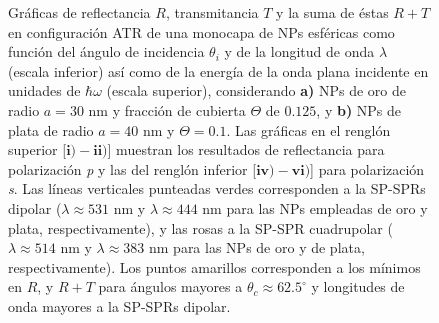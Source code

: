 \begin{figure}[b!]
\begin{subfigure}{.7\linewidth}
		\end{subfigure}\vspace*{-.5em}
	\caption{Gráficas de reflectancia $R$, transmitancia $T$ y la suma de éstas $R+T$   en configuración ATR de una monocapa de NPs esféricas como función del ángulo de incidencia $\theta_i$ y de la longitud de onda $\lambda$ (escala inferior) así como de la energía de la onda plana incidente en unidades de $\hbar\omega$ (escala superior), considerando \textbf{a)} NPs de oro de radio $a=30$ nm y fracción de cubierta $\Theta$ de $0.125$, y \textbf{b)} NPs de plata de radio $a=40$ nm y $\Theta=0.1$.  Las gráficas   en el renglón superior [$\mathbf{i)-ii)}$]  muestran los resultados de reflectancia para  polarización \emph{p} y las del renglón inferior  [$\mathbf{iv)-vi)}$] para polarización  \emph{s}. Las líneas verticales punteadas verdes corresponden a la SP-SPRs dipolar ($\lambda\approx 531$ nm y $\lambda\approx 444$ nm para las NPs empleadas de oro y plata, respectivamente), y las rosas a la SP-SPR cuadrupolar ($\lambda\approx 514$ nm y $\lambda\approx 383$ nm para las NPs de oro y de plata, respectivamente). Los puntos amarillos corresponden a los mínimos en $R$, y $R+T$ para ángulos mayores a $\theta_c\approx 62.5^\circ$ y longitudes de onda mayores a la SP-SPRs dipolar. }\label{fig:RT-AuAg}
	\end{figure}	

